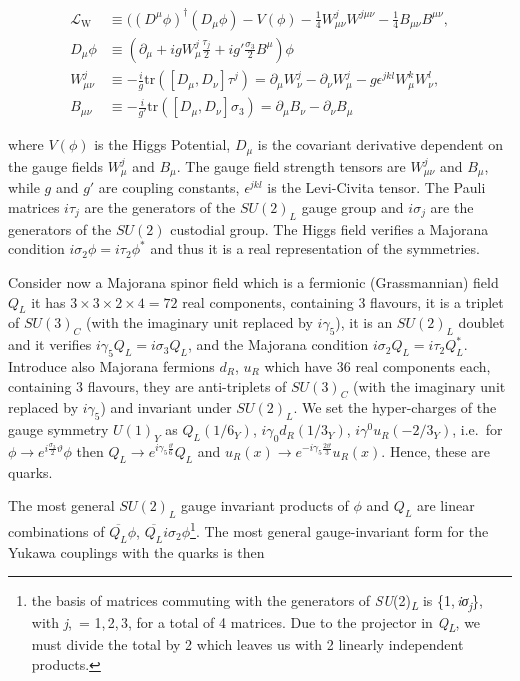 \documentclass[11pt]{book}
\begin{document}
\begin{equation}\begin{aligned}
    \mathcal{L_{\mathrm W}}&\equiv ((D^\mu\phi)^\dagger(D_\mu\phi)-V(\phi)-\frac{1}{4}W_{\mu\nu}^jW^{j\mu\nu}-\frac{1}{4}B_{\mu\nu}B^{\mu\nu},\\
    D_\mu\phi&\equiv \left(\partial_\mu+igW_\mu^j\frac{\tau_j}{2}+ig'\frac{\sigma_3}{2}B^\mu\right)\phi\\
    W_{\mu\nu}^j&\equiv -\frac{i}{g}\mathrm{tr}([D_\mu,D_\nu]\tau^j)=\partial_\mu W_\nu^j-\partial_\nu W_\mu^j-g\epsilon^{jkl}W^k_\mu W^l_\nu,\\
    B_{\mu\nu}&\equiv -\frac{i}{g'}\mathrm{tr}([D_\mu,D_\nu]\sigma_3)=\partial_\mu B_\nu-\partial_\nu B_\mu\end{aligned}\end{equation}

where \(V(\phi)\) is the Higgs Potential, \(D_\mu\) is the covariant
derivative dependent on the gauge fields \(W_\mu^j\) and \(B_\mu\). The
gauge field strength tensors are \(W_{\mu\nu}^j\) and \(B_\mu\), while
\(g\) and \(g'\) are coupling constants, \(\epsilon^{jkl}\) is the
Levi-Civita tensor. The Pauli matrices \(i\tau_j\) are the generators of
the \(SU(2)_L\) gauge group and \(i\sigma_j\) are the generators of the
\(SU(2)\) custodial group. The Higgs field verifies a Majorana condition
\(i\sigma_2 \phi=i\tau_2\phi^*\) and thus it is a real representation of
the symmetries.

Consider now a Majorana spinor field which is a fermionic (Grassmannian)
field \(Q_L\) it has \(3\times 3 \times 2 \times 4=72\) real components,
containing 3 flavours, it is a triplet of \(SU(3)_C\) (with the
imaginary unit replaced by \(i\gamma_5\)), it is an \(SU(2)_L\) doublet
and it verifies \(i\gamma_5 Q_L=i\sigma_3 Q_L\), and the Majorana
condition \(i\sigma_2 Q_L=i\tau_2 Q_L^*\). Introduce also Majorana
fermions \(d_R\), \(u_R\) which have \(36\) real components each,
containing 3 flavours, they are anti-triplets of \(SU(3)_C\) (with the
imaginary unit replaced by \(i\gamma_5\)) and invariant under
\(SU(2)_L\). We set the hyper-charges of the gauge symmetry \(U(1)_Y\)
as \(Q_L(1/6_Y)\), \(i\gamma_0d_R(1/3_Y)\), \(i\gamma^0u_R(-2/3_Y)\),
i.e.~for \(\phi\to e^{i\frac{\sigma_3}{2}\vartheta}\phi\) then
\(Q_L\to e^{i \gamma_5 \frac{\vartheta}{6}}Q_L\) and
\(u_R(x)\to e^{-i\gamma_5 \frac{2\vartheta}{3}} u_R(x)\). Hence, these
are quarks.

The most general \(SU(2)_L\) gauge invariant products of \(\phi\) and
\(Q_L\) are linear combinations of \(\overline{Q_L}\phi\),
\(\overline{Q_L}i\sigma_2\phi\)\footnote{the basis of matrices commuting
  with the generators of {\emph{SU}(2)\textsubscript{\emph{L}}} is
  {\{1, \emph{iσ}\textsubscript{\emph{j}}\}}, with
  {\emph{j},  = 1, 2, 3}, for a total of {4} matrices. Due to the
  projector in {\emph{Q}\textsubscript{\emph{L}}}, we must divide the
  total by {2} which leaves us with 2 linearly independent products.}.
The most general gauge-invariant form for the Yukawa couplings with the
quarks is then
\end{document}
